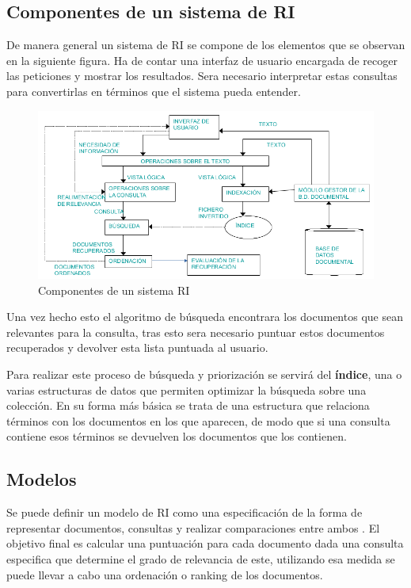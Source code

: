 \subsection{Componentes de un sistema de \acrshort{RI}}
De manera general un sistema de \acrshort{RI} se compone de los elementos que se observan en la siguiente figura. Ha de contar una interfaz de usuario encargada de recoger las peticiones y mostrar los resultados. Sera necesario interpretar estas consultas para convertirlas en términos que el sistema pueda entender.

\begin{figure}[h]
	\centering
	\includegraphics[width=\linewidth]{imagenes/componentes_ri}
	\caption{Componentes de un sistema RI \cite{ApuntesRI}}
	\label{fig:componentes RI}
\end{figure}

Una vez hecho esto el algoritmo de búsqueda encontrara los documentos que sean relevantes para la consulta, tras esto sera necesario puntuar estos documentos recuperados y devolver esta lista puntuada al usuario.

Para realizar este proceso de búsqueda y priorización se servirá del \textbf{índice}, una o varias estructuras de datos que permiten optimizar la búsqueda sobre una colección. En su forma más básica se trata de una estructura que relaciona términos con los documentos en los que aparecen, de modo que si una consulta contiene esos términos se devuelven los documentos que los contienen.

\subsection{Modelos}
Se puede definir un modelo de \acrshort{RI} como una especificación de la forma de representar documentos, consultas y realizar comparaciones entre ambos \cite{ApuntesRI}. El objetivo final es calcular una puntuación para cada documento dada una consulta especifica que determine el grado de relevancia de este, utilizando esa medida se puede llevar a cabo una ordenación o ranking de los documentos. 

